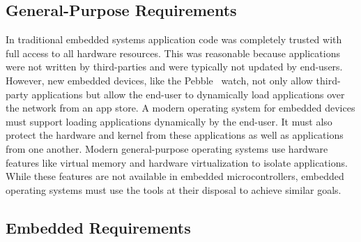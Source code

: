 
\subsection{General-Purpose Requirements}

In traditional embedded systems application code was completely trusted with
full access to all hardware resources. This was reasonable because applications
were not written by third-parties and were typically not updated by end-users.
However, new embedded devices, like the Pebble~\cite{pebble} watch, not only
allow third-party applications but allow the end-user to dynamically load
applications over the network from an app store.
A modern operating system for embedded devices must support loading applications
dynamically by the end-user. It must also protect the hardware and
kernel from these applications as well as applications from one another.
Modern general-purpose operating systems use hardware features like
virtual memory and hardware virtualization to isolate applications. While these
features are not available in embedded microcontrollers, embedded operating
systems must use the tools at their disposal to achieve similar goals.

\subsection{Embedded Requirements}
\label{sec:os:execution}

